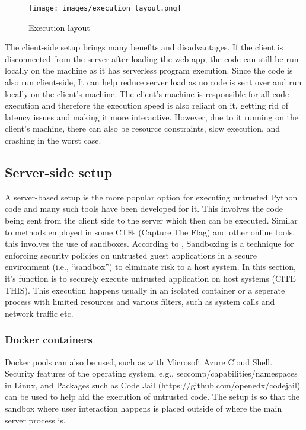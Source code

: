 \begin{figure}[H]
    \centering
    \texttt{[image: images/execution\_layout.png]}
    \caption{Execution layout}
    \label{fig:execution layout}
\end{figure}

The client-side setup brings many benefits and disadvantages. If the client is disconnected from the server after loading the web app, the code can still be run locally on the machine as it has serverless program execution. Since the code is also run client-side, It can help reduce server load as no code is sent over and run locally on the client's machine. The client's machine is responsible for all code execution and therefore the execution speed is also reliant on it, getting rid of latency issues and making it more interactive. However, due to it running on the client's machine, there can also be resource constraints, slow execution, and crashing in the worst case.

\subsection{Server-side setup}
A server-based setup is the more popular option for executing untrusted Python code and many such tools have been developed for it. This involves the code being sent from the client side to the server which then can be executed. Similar to methods employed in some CTFs (Capture The Flag) and other online tools, this involves the use of sandboxes. According to \cite{stephens2024sandbox}, Sandboxing is a technique for enforcing security policies on untrusted guest applications in a secure environment (i.e., “sandbox”) to eliminate risk to a host system. In this section, it's function is to securely execute untrusted application on host systems (CITE THIS). This execution happens usually in an isolated container or a seperate process with limited resources and various filters, such as system calls and network traffic etc.

\subsubsection{Docker containers}
Docker pools can also be used, such as with Microsoft Azure Cloud Shell. Security features of the operating system, e.g., seccomp/capabilities/namespaces in Linux, and Packages such as Code Jail (https://github.com/openedx/codejail) can be used to help aid the execution of untrusted code. The setup is so that the sandbox where user interaction happens is placed outside of where the main server process is. 


